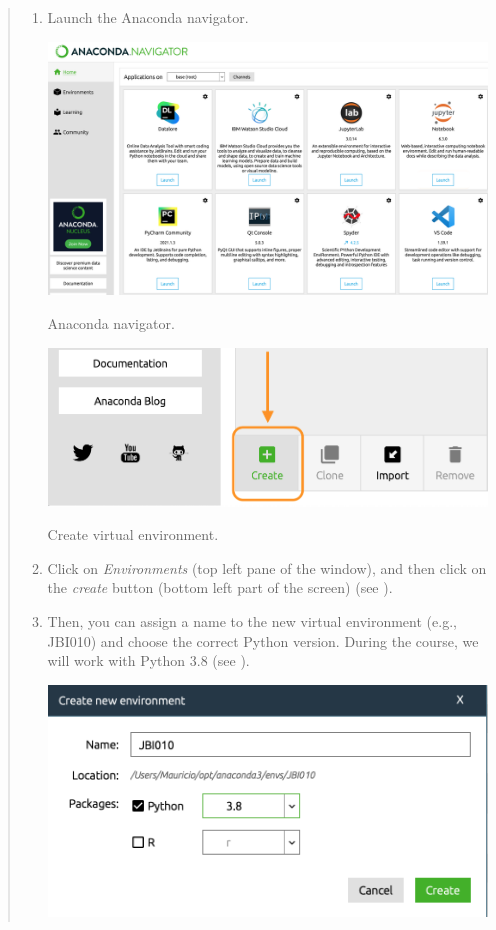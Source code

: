 \documentclass{latex-template/tufte-handout}
\begin{document}
\begin{quote}
	\begin{enumerate}
		\item Launch the Anaconda navigator.
			\begin{marginfigure}[-50em]
			  \includegraphics[width=1.2\linewidth]{assets/01-launch}
			  \caption{Anaconda navigator.}
			  \label{fig:img1}
			\end{marginfigure}
			\begin{marginfigure}[-28em]%
			  \includegraphics[width=\linewidth]{assets/02-create-ve}
			  \caption{Create virtual environment.}
			  \label{fig:img2}
			\end{marginfigure}
		\item Click on \emph{Environments} (top left pane of the window), and then click on the \emph{create} button (bottom left part of the screen) (see ).
		\item Then, you can assign a name to the new virtual environment (e.g., JBI010) and choose the correct Python version. During the course, we will work with Python 3.8 (see ).
			\begin{marginfigure}[-20em]%
			  \includegraphics[width=\linewidth]{assets/03-python-version}

\end{marginfigure}
\end{enumerate}
\end{quote}
\end{document}
